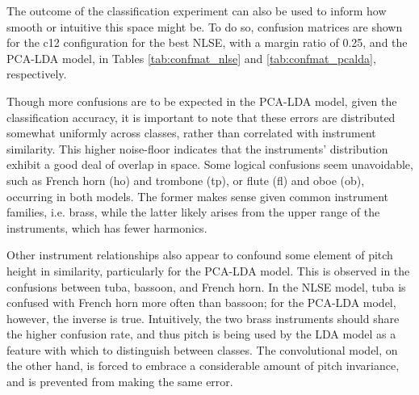 The outcome of the classification experiment can also be used to inform how smooth or intuitive this space might be.
To do so, confusion matrices are shown for the c12 configuration for the best NLSE, with a margin ratio of 0.25, and the PCA-LDA model, in Tables \ref{tab:confmat_nlse} and \ref{tab:confmat_pcalda}, respectively.

Though more confusions are to be expected in the PCA-LDA model, given the classification accuracy, it is important to note that these errors are distributed somewhat uniformly across classes, rather than correlated with instrument similarity.
This higher noise-floor indicates that the instruments' distribution exhibit a good deal of overlap in space.
Some logical confusions seem unavoidable, such as French horn (ho) and trombone (tp), or flute (fl) and oboe (ob), occurring in both models.
The former makes sense given common instrument families, i.e. brass, while the latter likely arises from the upper range of the instruments, which has fewer harmonics.

Other instrument relationships also appear to confound some element of pitch height in similarity, particularly for the PCA-LDA model.
This is observed in the confusions between tuba, bassoon, and French horn.
In the NLSE model, tuba is confused with French horn more often than bassoon; for the PCA-LDA model, however, the inverse is true.
Intuitively, the two brass instruments should share the higher confusion rate, and thus pitch is being used by the LDA model as a feature with which to distinguish between classes.
The convolutional model, on the other hand, is forced to embrace a considerable amount of pitch invariance, and is prevented from making the same error.

